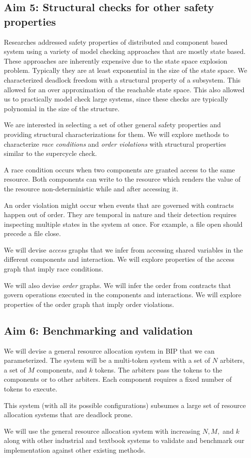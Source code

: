 \subsection{Aim 5: Structural checks for other safety properties} 

Researches addressed safety properties of distributed and 
component based system using a variety of model checking
approaches that are mostly state based. 
These approaches are inherently expensive due to the state
space explosion problem. 
Typically they are at least exponential in the size of the 
state space. 
%
We characterized deadlock freedom with a structural property 
of a subsystem. 
This allowed for an over approximation of the reachable state
space. 
This also allowed us to practically model check 
large systems,
since these checks are typically polynomial in the size 
of the structure. 

We are interested in selecting a set of other general safety
properties and providing structural characterizations 
for them.
We will explore methods to characterize {\em race conditions}
and {\em order violations} with structural properties
similar to the supercycle check.

A race condition occurs when two components are granted access
to the same resource. Both components can write to the resource
which renders the value of the resource non-deterministic while
and after accessing it. 

An order violation might occur when events that are governed 
with contracts happen out of order.
They are temporal in nature and their detection requires
inspecting multiple states in the system at once. 
For example, a file open should precede a file close. 

We will devise {\em access} graphs that we infer from 
accessing shared variables in the different components 
and interaction.
We will explore properties of the access graph that 
imply race conditions. 

We will also devise {\em order} graphs. 
We will infer the order from contracts that 
govern operations executed in the components
and interactions. 
We will explore properties of the order graph that 
imply order violations.  

\subsection{Aim 6: Benchmarking and validation } 
 
 We will devise a general resource allocation system
 in BIP  that we can parameterized.
 The system will be a multi-token system 
 with a set of $N$ arbiters, a set of $M$ components,
 and $k$ tokens. 
 The arbiters pass the tokens to the components or to other
 arbiters. 
 Each component requires a fixed number of tokens to 
 execute. 

 This system (with all its possible configurations)
 subsumes a large set of resource allocation
 systems that are deadlock prone. 

 We will use the general resource allocation system 
 with increasing $N, M,$ and $k$ 
 along with other industrial and textbook systems
 to validate and benchmark our implementation
 against other existing methods. 


